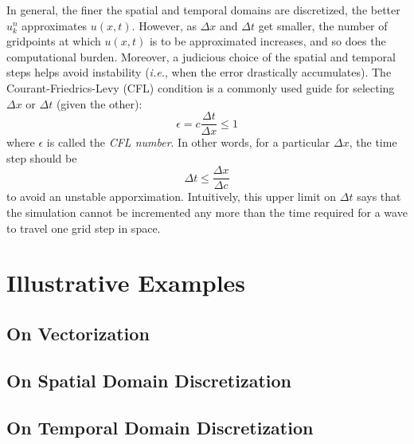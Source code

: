 \documentclass{article}
\begin{document}
In general, the finer the spatial and temporal domains are discretized, the better $u_{k}^{n}$ approximates $u \left(x,t\right)$.
However, as $\Delta x$ and $\Delta t$ get smaller, the number of gridpoints at which $u\left(x,t\right)$ is to be approximated increases,
and so does the computational burden.
Moreover, a judicious choice of the spatial and temporal steps helps avoid instability
(\textit{i.e.}, when the error drastically accumulates).
The Courant-Friedrics-Levy (CFL) condition is a commonly used guide for selecting $\Delta x$ or $\Delta t$ (given the other):
\begin{equation}
   \label{eqn: CFL condition}
   \epsilon = c \frac{\Delta t}{\Delta x} \leq 1
\end{equation}
where $\epsilon$ is called the \textit{CFL number}.
In other words, for a particular $\Delta x$, the time step should be
\begin{equation*}
   \Delta t \leq \frac{\Delta x}{\Delta c}
\end{equation*}
to avoid an unstable apporximation.
Intuitively, this upper limit on $\Delta t$ says that the simulation cannot be incremented any more than the time required
for a wave to travel one grid step in space.

\section{Illustrative Examples}
\label{sec: Illustrative Examples}

\lipsum[26]

\subsection{On Vectorization}
\label{subsec: On Vectorization}

\lipsum[42]

\subsection{On Spatial Domain Discretization}
\label{subsec: On Spatial Domain Discretization}

\lipsum[54]

\subsection{On Temporal Domain Discretization}
\label{subsec: On Temporal Domain Discretization}

\lipsum[92]
\end{document}

